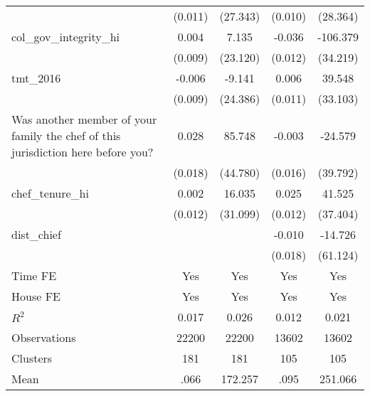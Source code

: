 {\begin{tabular}{l*{4}{c}}
                &  (0.011)         & (27.343)         &  (0.010)         & (28.364)         \\
col\_gov\_integrity\_hi&    0.004         &    7.135         &   -0.036\sym{***}& -106.379\sym{***}\\
                &  (0.009)         & (23.120)         &  (0.012)         & (34.219)         \\
tmt\_2016        &   -0.006         &   -9.141         &    0.006         &   39.548         \\
                &  (0.009)         & (24.386)         &  (0.011)         & (33.103)         \\
Was another member of your family the chef of this jurisdiction here before you?&    0.028         &   85.748\sym{*}  &   -0.003         &  -24.579         \\
                &  (0.018)         & (44.780)         &  (0.016)         & (39.792)         \\
chef\_tenure\_hi  &    0.002         &   16.035         &    0.025\sym{**} &   41.525         \\
                &  (0.012)         & (31.099)         &  (0.012)         & (37.404)         \\
dist\_chief      &                  &                  &   -0.010         &  -14.726         \\
                &                  &                  &  (0.018)         & (61.124)         \\
Time FE         &      Yes         &      Yes         &      Yes         &      Yes         \\
House FE        &      Yes         &      Yes         &      Yes         &      Yes         \\
\hline
\(R^{2}\)       &    0.017         &    0.026         &    0.012         &    0.021         \\
Observations    &    22200         &    22200         &    13602         &    13602         \\
Clusters        &      181         &      181         &      105         &      105         \\
Mean            &     .066         &  172.257         &     .095         &  251.066         \\
\hline\hline
\end{tabular}
}
